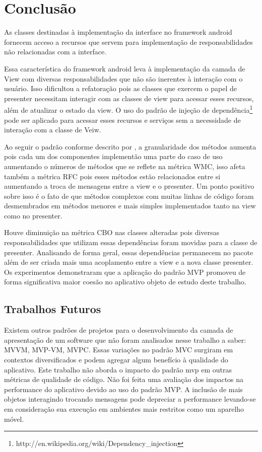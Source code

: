 \chapter{Conclusão}

As classes destinadas à implementação da interface no framework android fornecem
acceso a recursos que servem para implementação de responsabilidades não
relacionadas com a interface.

Essa característica do framework android leva à implementação da camada de View
com diversas responsabilidades que não são inerentes à interação com o
usuário. Isso dificultou a refatoração pois as classes que exercem o papel de
presenter necessitam interagir com as classes de view para acessar esses
recursos, além de atualizar o estado da view. O uso do padrão de injeção de
dependência\footnote{http://en.wikipedia.org/wiki/Dependency_injection} pode ser
aplicado para acessar esses recursos e serviços sem a necessidade de interação com a classe de Veiw.

Ao seguir o padrão conforme descrito por , a granularidade dos
métodos aumenta pois cada um dos componentes implementão uma parte do caso de
uso aumentando o números de métodos que se reflete na métrica WMC, isso afeta
também a métrica RFC pois esses métodos estão relacionados entre si aumentando a
troca de mensagens entre a view e o presenter. Um ponto positivo sobre isso é o
fato de que métodos  complexos com muitas linhas de código foram desmembrados em
métodos menores e mais simples implementados tanto na view como no presenter.

Houve diminuição na métrica CBO nas classes alteradas pois diversas
responsabilidades que utilizam essas dependências foram movidas para a classe de
presenter. Analisando de forma geral, essas dependências permanecem no pacote
além de ser criada mais uma acoplamento entre a view e a nova classe presenter.
Os experimentos demonstraram que a aplicação do padrão MVP promoveu de forma
significativa maior coesão no aplicativo objeto de estudo deste trabalho.


\section{Trabalhos Futuros}

Existem outros padrões de projetos para o desenvolvimento da camada de
apresentação de um software que não foram analisados nesse trabalho a saber: 
MVVM, MVP-VM, MVPC. Essas variações no padrão MVC surgiram em contextos
diversificados e podem agregar algum benefício à qualidade do aplicativo.
Este trabalho não aborda o impacto do padrão mvp em outras métricas de qualidade
de código.
Não foi feita uma avaliação dos impactos na performance do aplicativo devido ao
uso do padrão MVP. A inclusão de mais objetos interagindo trocando mensagens
pode depreciar a performance levando-se em consideração sua execução em
ambientes mais restritos como um aparelho móvel.
